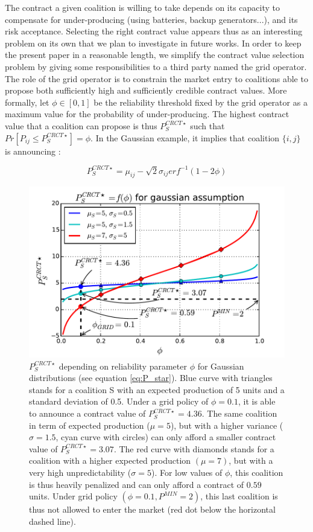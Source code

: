 \documentclass[journal]{IEEEtran}
\begin{document}
The contract a given coalition is willing to take depends on its capacity to compensate for under-producing (using batteries, backup generators...), and its risk acceptance. Selecting the right contract value appears thus as an interesting problem on its own that we plan to investigate in future works. In order to keep the present paper in a reasonable length, we simplify the contract value selection problem by giving some responsibilities to a third party named the grid operator. The role of the grid operator is to constrain the market entry to coalitions able to propose both sufficiently high and sufficiently credible contract values. More formally, let $ \phi \in [0,1] $ be the reliability threshold fixed by the grid operator as a maximum value for the probability of under-producing. The highest contract value that a coalition can propose is thus $ P_{S}^{CRCT \star} $ such that $ Pr[P_{ij} \leq P_{S}^{CRCT \star}] = \phi $. In the Gaussian example, it implies that coalition $ \{i,j\}$ is announcing :

\begin{equation}
\label{eq:P_star}
P_{S}^{CRCT \star} = \mu_{ij} - \sqrt{2} \sigma_{ij} erf^{-1}( 1 - 2 \phi )
\end{equation}

\begin{figure}
\includegraphics[scale=.48]{./figs/figure_1}
\caption{{\footnotesize $ P_{S}^{CRCT \star} $ depending on reliability parameter $ \phi $ for Gaussian distributions (see equation \ref{eq:P_star}). Blue curve with triangles stands for a coalition S with an expected production of 5 units and a standard deviation of 0.5. Under a grid policy of $ \phi = 0.1 $, it is able to announce a contract value of $ P_{S}^{CRCT \star} = 4.36 $. The same coalition in term of expected production ($\mu = 5 $), but with a higher variance ($ \sigma = 1.5 $, cyan curve with circles) can only afford a smaller contract value of $ P_{S}^{CRCT \star} = 3.07 $. The red curve with diamonds stands for a coalition with a higher expected production $(\mu = 7)$, but with a very high unpredictability ($ \sigma = 5 $). For low values of $ \phi $, this coalition is thus heavily penalized and can only afford a contract of $ 0.59 $ units. Under grid policy $ (\phi = 0.1, P^{MIN} = 2) $, this last coalition is thus not allowed to enter the market (red dot below the horizontal dashed line).} }
\label{fig:Gaussian}
\end{figure}
\end{document}
